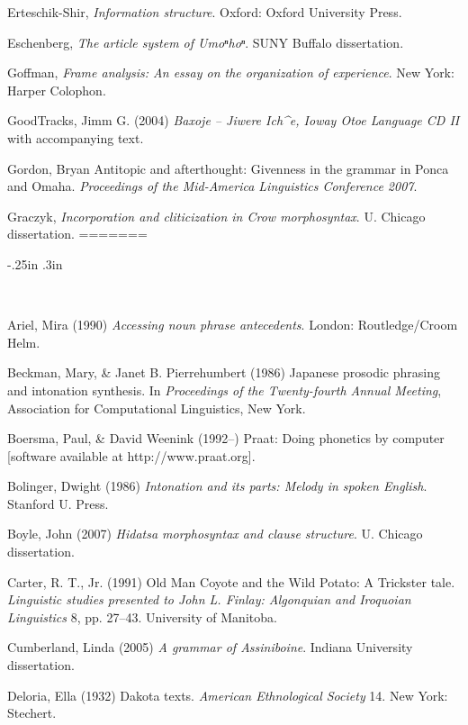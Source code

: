 \documentclass[output=paper]{LSP/langsci}
\begin{document}
\begin{reflist}
Erteschik-Shir, \citet{Nomi2007} \emph{Information structure}. Oxford: Oxford University Press.

Eschenberg, \citet{Ardis2005} \emph{The article system of Umoⁿhoⁿ}. SUNY Buffalo dissertation.

Goffman, \citet{Erving1974} \emph{Frame analysis: An essay on the organization of experience}. New York: Harper Colophon.

GoodTracks, Jimm G. (2004) \emph{Baxoje -- Jiwere Ich\^{}e, Ioway Otoe Language CD II} with accompanying text.

Gordon, Bryan \citet{James2008} Antitopic and afterthought: Givenness in the grammar in Ponca and Omaha. \emph{Proceedings of the Mid-America Linguistics Conference 2007}.

Graczyk, \citet{Randolph1991} \emph{Incorporation and cliticization in Crow morphosyntax}. U. Chicago dissertation.
=======
\newenvironment{reflist} {\begin{list} {} {\listparindent -.25in
\leftmargin .3in} \item \ \vspace{-.3in} } {\end{list} }

\begin{reflist}

Ariel, Mira (1990) \emph{Accessing noun phrase antecedents}. London: Routledge/Croom Helm. 

Beckman, Mary, \& Janet B. Pierrehumbert (1986) Japanese prosodic phrasing and intonation synthesis. In \emph{Proceedings of the Twenty-fourth Annual Meeting}, Association for Computational Linguistics, New York.

Boersma, Paul, \& David Weenink (1992--) Praat: Doing phonetics by computer [software available at http://www.praat.org].

Bolinger, Dwight (1986) \emph{Intonation and its parts: Melody in spoken English}. Stanford U. Press.

Boyle, John (2007) \emph{Hidatsa morphosyntax and clause structure}. U. Chicago dissertation.

Carter, R. T., Jr. (1991) Old Man Coyote and the Wild Potato: A Trickster tale. \emph{Linguistic studies presented to John L. Finlay: Algonquian and Iroquoian Linguistics} 8, pp. 27--43. University of Manitoba.

Cumberland, Linda (2005) \emph{A grammar of Assiniboine}. Indiana University dissertation.

Deloria, Ella (1932) Dakota texts. \emph{American Ethnological Society} 14. New York: Stechert.


\end{reflist}
\end{reflist}
\end{document}
